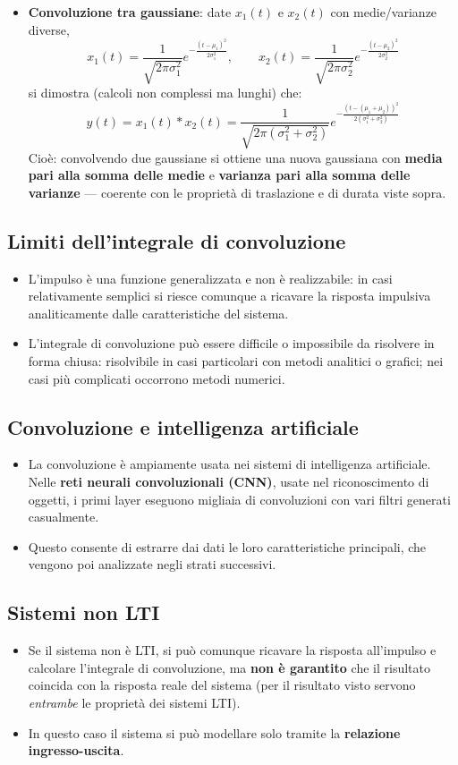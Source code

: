 \documentclass[12pt, a4paper]{article}
\begin{document}
\begin{itemize}
    \item \textbf{\textcolor{orange!80!black}{Convoluzione tra gaussiane}}: date $x_1(t)$ e $x_2(t)$ con medie/varianze diverse,
    $$x_1(t) = \frac{1}{\sqrt{2\pi\sigma_1^2}}e^{-\frac{(t-\mu_1)^2}{2\sigma_1^2}}, \qquad x_2(t) = \frac{1}{\sqrt{2\pi\sigma_2^2}}e^{-\frac{(t-\mu_2)^2}{2\sigma_2^2}}$$
    si dimostra (calcoli non complessi ma lunghi) che:
    $$y(t) = x_1(t)*x_2(t) = \frac{1}{\sqrt{2\pi(\sigma_1^2+\sigma_2^2)}}e^{-\frac{(t-(\mu_1+\mu_2))^2}{2(\sigma_1^2+\sigma_2^2)}}$$
    Cioè: convolvendo due gaussiane si ottiene una nuova gaussiana con \textbf{media pari alla somma delle medie} e \textbf{varianza pari alla somma delle varianze} — coerente con le proprietà di traslazione e di durata viste sopra.
\end{itemize}

\subsection{Limiti dell'integrale di convoluzione}
\begin{itemize}
    \item L'impulso è una funzione generalizzata e non è realizzabile: in casi relativamente semplici si riesce comunque a ricavare la risposta impulsiva analiticamente dalle caratteristiche del sistema.
    \item L'integrale di convoluzione può essere difficile o impossibile da risolvere in forma chiusa: risolvibile in casi particolari con metodi analitici o grafici; nei casi più complicati occorrono metodi numerici.
\end{itemize}

\subsection{Convoluzione e intelligenza artificiale}
\begin{itemize}
    \item La convoluzione è ampiamente usata nei sistemi di intelligenza artificiale. Nelle \textbf{reti neurali convoluzionali (CNN)}, usate nel riconoscimento di oggetti, i primi layer eseguono migliaia di convoluzioni con vari filtri generati casualmente.
    \item Questo consente di estrarre dai dati le loro caratteristiche principali, che vengono poi analizzate negli strati successivi.
\end{itemize}

\subsection{Sistemi non LTI}
\begin{itemize}
    \item Se il sistema non è LTI, si può comunque ricavare la risposta all'impulso e calcolare l'integrale di convoluzione, ma \textbf{non è garantito} che il risultato coincida con la risposta reale del sistema (per il risultato visto servono \emph{entrambe} le proprietà dei sistemi LTI).
    \item In questo caso il sistema si può modellare solo tramite la \textbf{relazione ingresso-uscita}.
\end{itemize}
\end{document}
